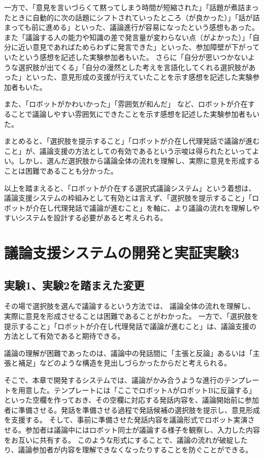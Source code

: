 \documentclass[11pt, a4paper]{jreport} %
\begin{document}
一方で、「意見を言いづらくて黙ってしまう時間が短縮された」「話題が煮詰まったときに自動的に次の話題にシフトされていったところ（が良かった）」「話が詰まっても前に進める」といった、議論進行が容易になったという感想もあった。
また「議論する人の能力や知識の差で発言量が変わらない点（がよかった）」「自分に近い意見であればためらわずに発言できた」といった、参加障壁が下がっていたという感想を記述した実験参加者もいた。
さらに「自分が思いつかないような選択肢が出てくる」「自分の漫然とした考えを言語化してくれる選択肢があった」といった、意見形成の支援が行えていたことを示す感想を記述した実験参加者もいた。


また、「ロボットがかわいかった」「雰囲気が和んだ」%
など、ロボットが介在することで議論しやすい雰囲気にできたことを示す感想を記述した実験参加者もいた。



まとめると、「選択肢を提示すること」「ロボットが介在し代理発話で議論が進むこと」が、議論支援の方法としての有効であるという示唆は得られたといってよい。しかし、選んだ選択肢から議論全体の流れを理解し、実際に意見を形成することは困難であることも分かった。


以上を踏まえると、「ロボットが介在する選択式議論システム」という着想は、議論支援システムの枠組みとして有効とは言えず、「選択肢を提示すること」「ロボットが介在し代理発話で議論が進むこと」を軸に、より議論の流れを理解しやすいシステムを設計する必要があると考えられる。



\chapter{議論支援システムの開発と実証実験3}


\section{実験1、実験2を踏まえた変更}
その場で選択肢を選んで議論するという方法では、
議論全体の流れを理解し、実際に意見を形成させることは困難であることがわかった。
一方で、「選択肢を提示すること」「ロボットが介在し代理発話で議論が進むこと」は、議論支援の方法として有効であると期待できる。


議論の理解が困難であったのは、議論中の発話間に「主張と反論」あるいは「主張と補足」などのような構造を見出しづらかったからだと考えられる。

そこで、本章で開発するシステムでは、議論がかみ合うような進行のテンプレートを用意した。テンプレートには「ここでロボットAがロボットBに反論する」といった空欄を作っておき、その空欄に対応する発話内容を、議論開始前に参加者に準備させる。発話を準備させる過程で発話候補の選択肢を提示し、意見形成を支援する。
そして、事前に準備させた発話内容を議論形式でロボット実演させる。参加者は議論中にはロボット同士が議論する様子を観察し、入力した内容をお互いに共有する。
このような形式にすることで、議論の流れが破綻したり、議論参加者が内容を理解できなくなったりすることを防ぐことができる。
\end{document}
